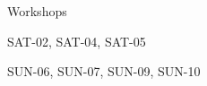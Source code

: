 \documentclass{article}
\newcommand{\room}[1]{
    \noindent
    #1
    \vspace{.2in}

}
\begin{document}
\rssheader[2in]

\vfill

\fontsize{50pt}{60pt}
\selectfont

\begin{center}
    \room{Workshops}
\fontsize{18pt}{24pt} \selectfont
    \room{SAT-02, SAT-04, SAT-05}
    \room{SUN-06, SUN-07, SUN-09, SUN-10}
\end{center}

\rssarrowleft

\vfill
\end{document}
